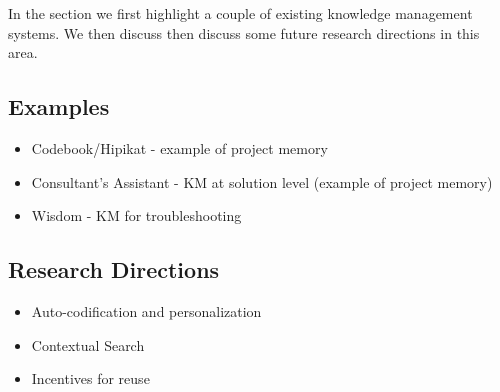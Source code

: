 In the section we first highlight a couple of existing knowledge management systems. We then discuss then discuss some future research directions in this area.  

\subsection{Examples}
\begin{itemize}
\item Codebook/Hipikat - example of project memory
\item Consultant's Assistant - KM at solution level (example of project memory)
\item Wisdom - KM for troubleshooting
\end{itemize}

\subsection{Research Directions}
\begin{itemize}
\item Auto-codification and personalization
\item Contextual Search
\item Incentives for reuse
\end{itemize}
